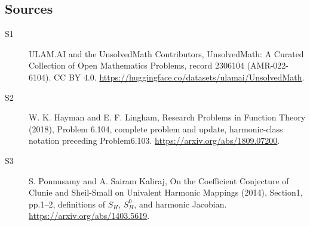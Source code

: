\documentclass[11pt]{article}
\begin{document}
\subsection{Sources}
\begin{description}
\item[\hypertarget{source:2306104:1}{S1}] ULAM.AI and the UnsolvedMath Contributors, UnsolvedMath: A Curated Collection of Open Mathematics Problems, record 2306104 (AMR-022-6104). CC BY 4.0. \url{https://huggingface.co/datasets/ulamai/UnsolvedMath}.
\item[\hypertarget{source:2306104:2}{S2}] W. K. Hayman and E. F. Lingham, Research Problems in Function Theory (2018), Problem 6.104, complete problem and update, harmonic-class notation preceding Problem6.103. \url{https://arxiv.org/abs/1809.07200}.
\item[\hypertarget{source:2306104:3}{S3}] S. Ponnusamy and A. Sairam Kaliraj, On the Coefficient Conjecture of Clunie and Sheil-Small on Univalent Harmonic Mappings (2014), Section1, pp.1--2, definitions of $S_H$, $S_H^0$, and harmonic Jacobian. \url{https://arxiv.org/abs/1403.5619}.
\end{description}
\label{end:2306104}
\end{document}
